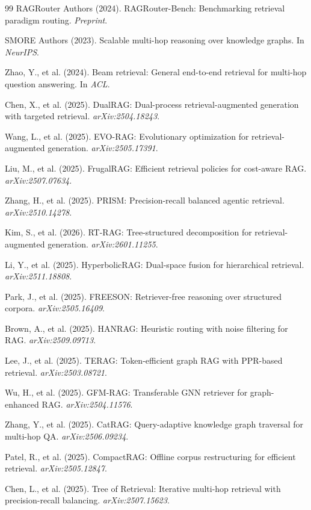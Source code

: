 \documentclass[11pt,a4paper]{article}
\begin{document}
\begin{thebibliography}{99}
RAGRouter Authors (2024).
RAGRouter-Bench: Benchmarking retrieval paradigm routing.
\textit{Preprint}.

SMORE Authors (2023).
Scalable multi-hop reasoning over knowledge graphs.
In \textit{NeurIPS}.

Zhao, Y., et al. (2024).
Beam retrieval: General end-to-end retrieval for multi-hop question answering.
In \textit{ACL}.

Chen, X., et al. (2025).
DualRAG: Dual-process retrieval-augmented generation with targeted retrieval.
\textit{arXiv:2504.18243}.

Wang, L., et al. (2025).
EVO-RAG: Evolutionary optimization for retrieval-augmented generation.
\textit{arXiv:2505.17391}.

Liu, M., et al. (2025).
FrugalRAG: Efficient retrieval policies for cost-aware RAG.
\textit{arXiv:2507.07634}.

Zhang, H., et al. (2025).
PRISM: Precision-recall balanced agentic retrieval.
\textit{arXiv:2510.14278}.

Kim, S., et al. (2026).
RT-RAG: Tree-structured decomposition for retrieval-augmented generation.
\textit{arXiv:2601.11255}.

Li, Y., et al. (2025).
HyperbolicRAG: Dual-space fusion for hierarchical retrieval.
\textit{arXiv:2511.18808}.

Park, J., et al. (2025).
FREESON: Retriever-free reasoning over structured corpora.
\textit{arXiv:2505.16409}.

Brown, A., et al. (2025).
HANRAG: Heuristic routing with noise filtering for RAG.
\textit{arXiv:2509.09713}.

Lee, J., et al. (2025).
TERAG: Token-efficient graph RAG with PPR-based retrieval.
\textit{arXiv:2503.08721}.

Wu, H., et al. (2025).
GFM-RAG: Transferable GNN retriever for graph-enhanced RAG.
\textit{arXiv:2504.11576}.

Zhang, Y., et al. (2025).
CatRAG: Query-adaptive knowledge graph traversal for multi-hop QA.
\textit{arXiv:2506.09234}.

Patel, R., et al. (2025).
CompactRAG: Offline corpus restructuring for efficient retrieval.
\textit{arXiv:2505.12847}.

Chen, L., et al. (2025).
Tree of Retrieval: Iterative multi-hop retrieval with precision-recall balancing.
\textit{arXiv:2507.15623}.

\end{thebibliography}
\end{document}

